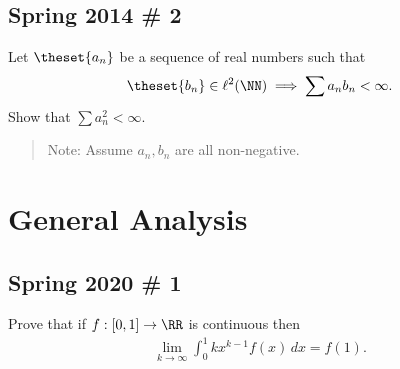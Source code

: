 \hypertarget{spring-2014-2}{%
\subsection{Spring 2014 \# 2}\label{spring-2014-2}}

Let \(\theset{a_n}\) be a sequence of real numbers such that
\begin{align*}
\theset{b_n} \in \ell^2(\NN) \implies \sum a_n b_n < \infty.
\end{align*} Show that \(\sum a_n^2 < \infty\).

\begin{quote}
Note: Assume \(a_n, b_n\) are all non-negative.
\end{quote}

\hypertarget{general-analysis}{%
\section{General Analysis}\label{general-analysis}}

\hypertarget{spring-2020-1}{%
\subsection{Spring 2020 \# 1}\label{spring-2020-1}}

Prove that if \(f: [0, 1] \to \RR\) is continuous then
\begin{align*}
\lim_{k\to\infty} \int_0^1 kx^{k-1} f(x) \,dx = f(1)
.\end{align*}

